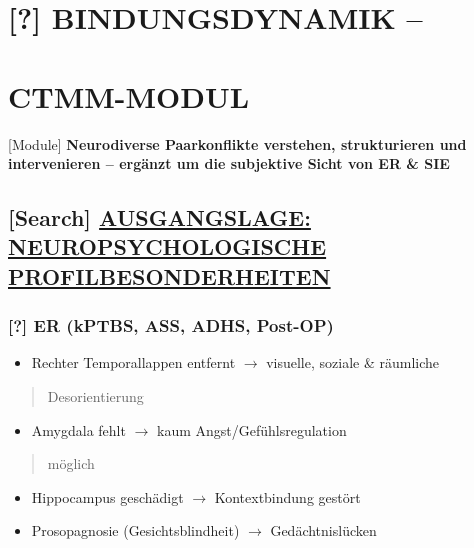 \hypertarget{bindungsdynamik}{%
\section{\texorpdfstring{[?] \textbf{BINDUNGSDYNAMIK --} }{[?] BINDUNGSDYNAMIK -- }}\label{bindungsdynamik}}

\hypertarget{ctmm-modul}{%
\section{\texorpdfstring{\textbf{CTMM-MODUL}}{CTMM-MODUL}}\label{ctmm-modul}}

[Module] \textbf{Neurodiverse Paarkonflikte verstehen, strukturieren und intervenieren -- ergänzt um die subjektive Sicht von ER \& SIE}

\hypertarget{ausgangslage-neuropsychologische-profilbesonderheiten}{%
\subsection{\texorpdfstring{[Search] \textbf{\ul{AUSGANGSLAGE: NEUROPSYCHOLOGISCHE PROFILBESONDERHEITEN}}}{[Search] AUSGANGSLAGE: NEUROPSYCHOLOGISCHE PROFILBESONDERHEITEN}}\label{ausgangslage-neuropsychologische-profilbesonderheiten}}

\hypertarget{er-kptbs-ass-adhs-post-op}{%
\subsubsection{\texorpdfstring{[?] \textbf{ER (kPTBS, ASS, ADHS, Post-OP)}}{[?] ER (kPTBS, ASS, ADHS, Post-OP)}}\label{er-kptbs-ass-adhs-post-op}}

\begin{itemize}
\tightlist
\item
  Rechter Temporallappen entfernt $\rightarrow$ visuelle, soziale \& räumliche
\end{itemize}

\begin{quote}
Desorientierung
\end{quote}

\begin{itemize}
\tightlist
\item
  Amygdala fehlt $\rightarrow$ kaum Angst/Gefühlsregulation
\end{itemize}

\begin{quote}
möglich
\end{quote}

\begin{itemize}
\tightlist
\item
  Hippocampus geschädigt $\rightarrow$ Kontextbindung gestört
\item
  Prosopagnosie (Gesichtsblindheit) $\rightarrow$ Gedächtnislücken
\end{itemize}

